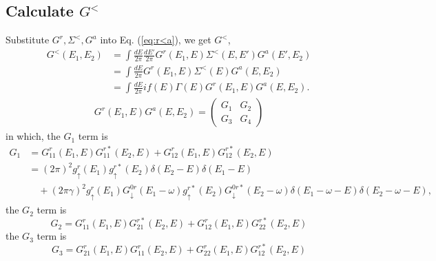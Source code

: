 \documentclass[11pt,a4paper]{article}
\begin{document}
\subsection{Calculate $G^{<}$}
Substitute $G^{r}, \Sigma^{<}, G^{a}$ into Eq. (\ref{eq:r<a}), we get $G^{<}$,
\begin{equation}
\begin{split}
G^{<}(E_{1},E_{2})&=\int\frac{dE}{2\pi}\frac{dE'}{2\pi}G^{r}(E_{1}, E) \Sigma^{<}(E, E') G^{a}(E', E_{2}) \\
&= \int \frac{dE}{2\pi} G^{r}\left(E_{1}, E\right) \Sigma^{<}\left(E\right) G^{a}\left(E, E_{2}\right) \\
&= \int \frac{dE}{2\pi} if(E)\Gamma(E) G^{r}\left(E_{1}, E\right) G^{a}\left(E, E_{2}\right).
\end{split}
\end{equation}
\begin{equation}
\begin{split}
G^{r}\left(E_{1}, E\right) G^{a}\left(E, E_{2}\right) =
\left(\begin{array}{cc}
G_{1} & G_{2} \\
G_{3} & G_{4}
\end{array}\right)
\end{split}
\end{equation}
in which, the $G_{1}$ term is
\begin{equation}
\begin{split}
G_{1} &= G_{11}^{r}(E_{1}, E)G_{11}^{r*}(E_{2},E)+G_{12}^{r}(E_{1},E)G_{12}^{r*}(E_{2},E) \\
&= (2 \pi)^{2} g_{\uparrow}^{r}\left(E_{1}\right)  g_{\uparrow}^{r*}\left(E_{2}\right) \delta\left(E_{2}-E\right) \delta\left(E_{1}-E\right) \\
&\quad + (2 \pi \gamma)^{2} g_{\uparrow}^{r}\left(E_{1}\right) G_{\downarrow}^{0r}\left(E_{1}-\omega\right)  g_{\uparrow}^{r*}\left(E_{2}\right) G_{\downarrow}^{0r*}\left(E_{2}-\omega\right) \delta\left(E_{1}-\omega-E\right) \delta\left(E_{2}-\omega-E\right),
\end{split}
\end{equation}
the $G_{2}$ term is
\begin{equation}
G_{2} = G_{11}^{r}(E_{1}, E)G_{21}^{r*}(E_{2},E) + G_{12}^{r}(E_{1}, E)G_{22}^{r*}(E_{2},E)
\end{equation}
the $G_{3}$ term is
\begin{equation}
G_{3} = G_{21}^{r}(E_{1},E)G_{11}^{r}(E_{2},E) + G_{22}^{r}(E_{1},E)G_{12}^{r*}(E_{2},E)
\end{equation}
\end{document}
